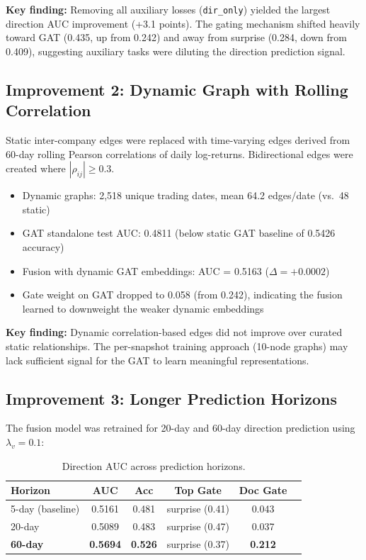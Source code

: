 \documentclass[12pt,a4paper]{article}
\begin{document}
\noindent\textbf{Key finding:} Removing all auxiliary losses (\texttt{dir\_only}) yielded the largest direction AUC improvement (+3.1 points). The gating mechanism shifted heavily toward GAT (0.435, up from 0.242) and away from surprise (0.284, down from 0.409), suggesting auxiliary tasks were diluting the direction prediction signal.

\subsection{Improvement 2: Dynamic Graph with Rolling Correlation}

Static inter-company edges were replaced with time-varying edges derived from 60-day rolling Pearson correlations of daily log-returns. Bidirectional edges were created where $|\rho_{ij}| \geq 0.3$.

\begin{itemize}[noitemsep]
    \item Dynamic graphs: 2,518 unique trading dates, mean 64.2 edges/date (vs.\ 48 static)
    \item GAT standalone test AUC: 0.4811 (below static GAT baseline of 0.5426 accuracy)
    \item Fusion with dynamic GAT embeddings: AUC = 0.5163 ($\Delta = +0.0002$)
    \item Gate weight on GAT dropped to 0.058 (from 0.242), indicating the fusion learned to downweight the weaker dynamic embeddings
\end{itemize}

\noindent\textbf{Key finding:} Dynamic correlation-based edges did not improve over curated static relationships. The per-snapshot training approach (10-node graphs) may lack sufficient signal for the GAT to learn meaningful representations.

\subsection{Improvement 3: Longer Prediction Horizons}

The fusion model was retrained for 20-day and 60-day direction prediction using $\lambda_v = 0.1$:

\begin{table}[H]
\centering
\caption{Direction AUC across prediction horizons.}
\begin{tabular}{lccccc}
\toprule
\textbf{Horizon} & \textbf{AUC} & \textbf{Acc} & \textbf{Top Gate} & \textbf{Doc Gate} \\
\midrule
5-day (baseline) & 0.5161 & 0.481 & surprise (0.41) & 0.043 \\
20-day           & 0.5089 & 0.483 & surprise (0.47) & 0.037 \\
\textbf{60-day}  & \textbf{0.5694} & \textbf{0.526} & surprise (0.37) & \textbf{0.212} \\
\bottomrule
\end{tabular}
\end{table}
\end{document}
